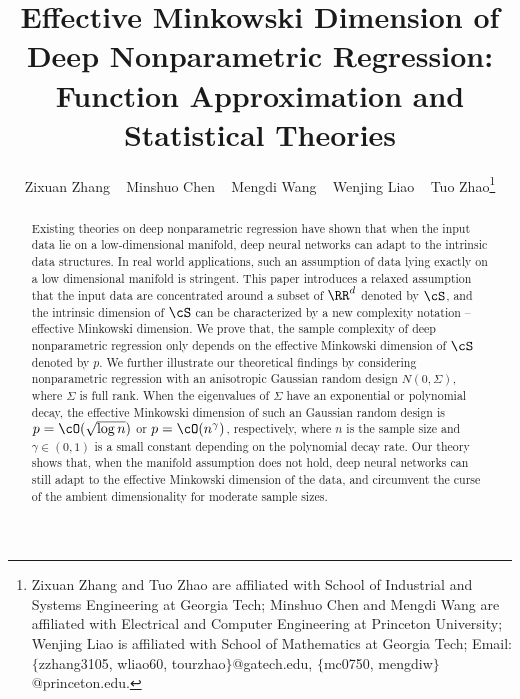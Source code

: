 \documentclass[11pt]{article} %
\title{\huge \bf Effective Minkowski Dimension of Deep Nonparametric Regression:\\ Function Approximation and Statistical Theories}
\author{Zixuan Zhang ~ Minshuo Chen ~ Mengdi Wang ~ Wenjing Liao ~ Tuo Zhao\thanks{Zixuan Zhang and Tuo Zhao are affiliated with School of Industrial and Systems Engineering at Georgia Tech; Minshuo Chen and Mengdi Wang are affiliated with Electrical and Computer Engineering at Princeton University; Wenjing Liao is affiliated with School of Mathematics at Georgia Tech; Email: $\{$zzhang3105, wliao60, tourzhao$\}$@gatech.edu, $\{$mc0750, mengdiw$\}$@princeton.edu.}}
\begin{document}
\maketitle




\begin{abstract}

Existing theories on deep nonparametric regression have shown that when the input data lie on a low-dimensional manifold, deep neural networks can adapt to the intrinsic data structures. In real world applications, such an assumption of data lying exactly on a low dimensional manifold is stringent. This paper introduces a relaxed assumption that the input data are concentrated around a subset of $\RR^d$ denoted by $\cS$, and the intrinsic dimension of $\cS$ can be characterized by a new complexity notation -- effective Minkowski dimension. We prove that, the sample complexity of deep nonparametric regression only depends on the effective Minkowski dimension of $\cS$ denoted by $p$. We further illustrate our theoretical findings by considering nonparametric regression with an anisotropic Gaussian random design $N(0,\Sigma)$, where $\Sigma$ is full rank. When the eigenvalues of $\Sigma$ have an exponential or polynomial decay, the effective Minkowski dimension of such an Gaussian random design is $p=\cO(\sqrt{\log n})$ or $p=\cO(n^\gamma)$, respectively, where $n$ is the sample size and $\gamma\in(0,1)$ is a small constant depending on the polynomial decay rate. Our theory shows that, when the manifold assumption does not hold, deep neural networks can still adapt to the effective Minkowski dimension of the data, and circumvent the curse of the ambient dimensionality for moderate sample sizes.
\end{abstract}


















\appendix

\end{document}
